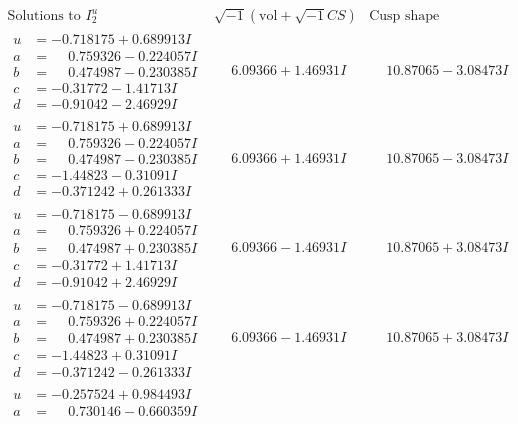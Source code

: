 \documentclass[1p]{elsarticle_modified}
\theoremstyle{definition}
\newcommand{\I}{\sqrt{-1}}
\begin{document}
$$\begin{array}{c|c|c}  
\text{Solutions to }I^u_{2}& \I (\text{vol} + \sqrt{-1}CS) & \text{Cusp shape}\\
 \hline 
\begin{aligned}
u &= -0.718175 + 0.689913 I \\
a &= \phantom{-}0.759326 - 0.224057 I \\
b &= \phantom{-}0.474987 - 0.230385 I \\
c &= -0.31772 - 1.41713 I \\
d &= -0.91042 - 2.46929 I\end{aligned}
 & \phantom{-}6.09366 + 1.46931 I & \phantom{-}10.87065 - 3.08473 I \\ \hline\begin{aligned}
u &= -0.718175 + 0.689913 I \\
a &= \phantom{-}0.759326 - 0.224057 I \\
b &= \phantom{-}0.474987 - 0.230385 I \\
c &= -1.44823 - 0.31091 I \\
d &= -0.371242 + 0.261333 I\end{aligned}
 & \phantom{-}6.09366 + 1.46931 I & \phantom{-}10.87065 - 3.08473 I \\ \hline\begin{aligned}
u &= -0.718175 - 0.689913 I \\
a &= \phantom{-}0.759326 + 0.224057 I \\
b &= \phantom{-}0.474987 + 0.230385 I \\
c &= -0.31772 + 1.41713 I \\
d &= -0.91042 + 2.46929 I\end{aligned}
 & \phantom{-}6.09366 - 1.46931 I & \phantom{-}10.87065 + 3.08473 I \\ \hline\begin{aligned}
u &= -0.718175 - 0.689913 I \\
a &= \phantom{-}0.759326 + 0.224057 I \\
b &= \phantom{-}0.474987 + 0.230385 I \\
c &= -1.44823 + 0.31091 I \\
d &= -0.371242 - 0.261333 I\end{aligned}
 & \phantom{-}6.09366 - 1.46931 I & \phantom{-}10.87065 + 3.08473 I \\ \hline\begin{aligned}
u &= -0.257524 + 0.984493 I \\
a &= \phantom{-}0.730146 - 0.660359 I \\

\end{aligned}
\end{array}$$
\end{document}
